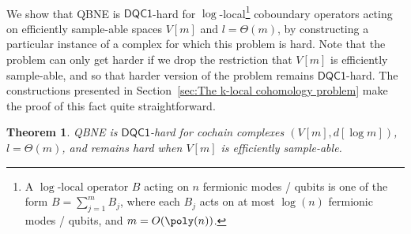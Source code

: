 \documentclass[11pt]{article}
\numberwithin{equation}{section}
\newcommand{\DQC}{\mathsf{DQC1}}
\renewcommand\( {\left(}
\renewcommand\) {\right)}
\newtheorem{thm}{Theorem}
\begin{document}
\ 

We show that {\sc QBNE} is $\DQC$-hard for $\log$-local\footnote{A $\log$-local operator $B$ acting on $n$ fermionic modes / qubits is one of the form $B = \sum_{j=1}^m B_j$, where each $B_j$ acts on at most $\log(n)$ fermionic modes / qubits, and $m = O(\poly(n))$.} coboundary operators acting on efficiently sample-able spaces $V[m]$ and $l=\Theta(m)$, by constructing a particular instance of a complex for which this problem is hard. Note that the problem can only get harder if we drop the restriction that $V[m]$ is efficiently sample-able, and so that harder version of the problem remains $\DQC$-hard. The constructions presented in Section~\ref{sec:The k-local cohomology problem}  make the proof of this fact quite straightforward.

\begin{thm}\label{theo:dqc1_hardness}
	{\sc QBNE} is $\DQC$-hard for cochain complexes $(V[m],d[\log m])$, $l = \Theta(m)$, and remains hard when $V[m]$ is efficiently sample-able.
\end{thm}
\end{document}
